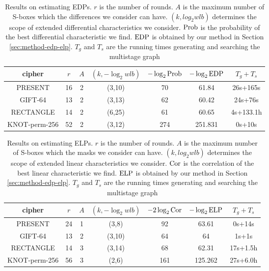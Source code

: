 \begin{table}
	\caption{Results on estimating EDPs. $r$ is the number of rounds. $A$ is the maximum number of S-boxes which the differences we consider can have. $(k,log_2wlb)$ determines the scope of extended differential characteristics we consider. $\text{Prob}$ is the probability of the best differential characteristic we find. $\text{EDP}$ is obtained by our method in Section \ref{sec:method-edp-elp}. $T_g$ and $T_s$ are the running times generating and searching the multistage graph}\label{tab:EDP}
	\centering
	\begin{tabular}{|c|c|c|c|c|c|c|}
		\hline
		cipher & $r$ & $A$ & $(k,-\log_2wlb)$ & $-\log_2\text{Prob}$ & $-\log_2\text{EDP}$ & $T_g+T_s$ \\
		\hline
		PRESENT & 16 & 2 & (3,10) & 70 & 61.84 & 26s+165s\\
		\hline
		GIFT-64 & 13 & 2 & (3,13) & 62 & 60.42 & 24s+76s\\
		\hline 
		RECTANGLE & 14 & 2 & (6,25) & 61 & 60.65 & 4s+133.1h \\
		\hline
		KNOT-perm-256 & 52 & 2 & (3,12) & 274 & 251.831 & 0s+10s\\
		\hline
	\end{tabular}
\end{table}

\begin{table}
	\caption{Results on estimating ELPs. $r$ is the number of rounds. $A$ is the maximum number of S-boxes which the masks we consider can have. $(k,log_2wlb)$ determines the scope of extended linear characteristics we consider. $\text{Cor}$ is the correlation of the best linear characteristic we find. $\text{ELP}$ is obtained by our method in Section \ref{sec:method-edp-elp}. $T_g$ and $T_s$ are the running times generating and searching the multistage graph}\label{tab:ELP}
	\centering
	\begin{tabular}{|c|c|c|c|c|c|c|}
		\hline
		cipher & $r$ & $A$ & $(k,-\log_2wlb)$ & $-2\log_2\text{Cor}$ & $-\log_2\text{ELP}$ & $T_g+T_s$ \\
		\hline
		PRESENT & 24 & 1 & (3,8) & 92 & 63.61 & 0s+14s\\
		\hline
		GIFT-64 & 13 & 2 & (3,10) & 64 & 64 & 1s+1s\\
		\hline 
		RECTANGLE & 14 & 3 & (3,14) & 68 & 62.31 & 17s+1.5h \\
		\hline
		KNOT-perm-256 & 56 & 3 & (2,6) & 161 & 125.262 & 27s+6.0h\\
		\hline
	\end{tabular}
\end{table}

